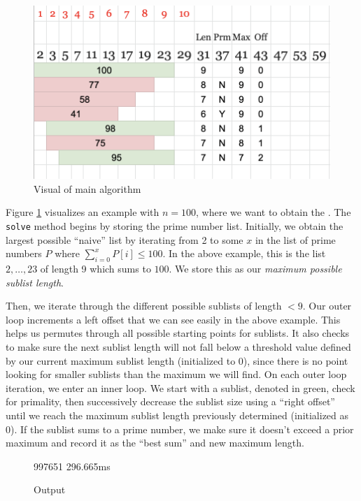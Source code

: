 \documentclass{article}
\begin{document}
\begin{figure}[H]
	\centering
	\includegraphics[scale=0.5]{../figures/spreadsheet.png}
	\caption{Visual of main algorithm}\label{ss}
\end{figure}

Figure \ref{ss} visualizes an example with $n=100$, where we want to obtain the . The \verb|solve| method begins
by storing the prime number list. Initially, we obtain the largest possible ``naive'' list
by iterating from 2 to some $x$ in the list of prime numbers $P$ where $\sum_{i=0}^xP[i] \leq 100$.
In the above example, this is the list $2,\ldots,23$ of length 9 which sums to $100$. We store this as our \textit{maximum possible sublist length}.

Then, we iterate through the different possible sublists of length $< 9$. Our outer loop increments a 
left offset that we can see easily in the above example. This helps us permutes through all possible starting points for sublists. It also checks to make sure the next sublist length will not fall below a threshold value defined by our current maximum sublist length (initialized to 0), since there is no point looking for smaller sublists than the maximum we will find.
On each outer loop iteration, we enter an inner loop. We start with a sublist, denoted in green, check for primality,
then successively decrease the sublist size using a ``right offset'' until we reach the maximum sublist length previously determined (initialized as 0). If the sublist sums to a prime number, we make sure it doesn't exceed a prior maximum and record it as the ``best sum'' and new maximum length.

\begin{figure}[H]
\centering
\begin{BVerbatim*}
997651
296.665ms
\end{BVerbatim*}
\caption{Output}
\end{figure}
\end{document}
